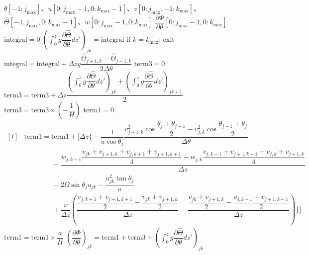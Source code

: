 \documentclass[ja=standard,xelatex]{bxjsarticle}
\newcommand{\pdif}[2]{\dfrac{\partial{#1}}{\partial#2}}
\newcommand{\dint}{\displaystyle\int}
\newcommand{\bracketnormal}[1]{\left(#1\right)}
\begin{document}
\begin{algorithm}[H]
  \caption*{\textbf{subroutine:} calculate\_partial\_Phi}
  \begin{algorithmic}[1]
    \Require $\theta[-1:j_\text{max}]$、$u[0:j_\text{max}-1,0:k_\text{max}-1]$、$v[0:j_\text{max},-1:k_\text{max}]$、$\hat{\Theta}[-1,j_\text{max},0:k_\text{max}-1]$、$w[0:j_\text{max}-1,0:k_\text{max}]$
    \Ensure $\pdif{\Phi}{\theta}[0:j_\text{max}-1,0:k_\text{max}]$
    \Statex
    \State {}
    \State $\text{integral} = 0$
    \State $\bracketnormal{\dint_0^z g\pdif{\hat{\Theta}}{\theta}dz'}_{jk} = \text{integral} $
    \State if $k=k_\text{max}$: exit
    \State $\text{integral}=\text{integral} + \Delta z g\dfrac{\hat{\Theta}_{j+1,k}-\hat{\Theta}_{j-1,k}}{2\Delta \theta}$
    \EndDo
    \State {}
    \State $\text{term3}=0$
    \State $\text{term3} = \text{term3} + \Delta z\dfrac{\bracketnormal{\dint_0^z g\pdif{\hat{\Theta}}{\theta}dz'}_{jk} + \bracketnormal{\dint_0^z g\pdif{\hat{\Theta}}{\theta}dz'}_{jk+1} }{2}$
    \EndDo
    \State $\text{term3} = \text{term3}\times\bracketnormal{-\dfrac{1}{H}}$
    \State {}
    \State $\text{term1}=0$
    \State $\begin{aligned}[t]
    &\text{term1} = \text{term1} + \Bigg[\Delta z\Bigg\{-\dfrac{1}{a\cos\theta_j}\dfrac{v_{j+1,k}^2 \cos\dfrac{\theta_j + \theta_{j+1}}{2}-v_{j,k}^2 \cos\dfrac{\theta_{j-1} + \theta_{j}}{2}}{\Delta \theta} \\[5pt]
    &\qquad\qquad - \dfrac{w_{j,k+1}\dfrac{v_{jk}+v_{j+1,k}+v_{j,k+1}+v_{j+1,k+1}}{4}-w_{j,k}\dfrac{v_{j,k-1}+v_{j+1,k-1}+v_{j,k}+v_{j+1,k}}{4}}{\Delta z}\\[5pt]
    &\qquad\qquad -2\Omega \sin\theta_{j}u_{jk}-\dfrac{u_{jk}^2\tan\theta_j}{a}\\[5pt]
    &\qquad\qquad+ \dfrac{\nu}{\Delta z}\bracketnormal{\dfrac{\dfrac{v_{j,k+1}+v_{j+1,k+1}}{2}-\dfrac{v_{jk}+v_{j+1,k}}{2}}{\Delta z}-\dfrac{\dfrac{v_{jk}+v_{j+1,k}}{2}-\dfrac{v_{j,k-1}+v_{j+1,k-1}}{2}}{\Delta z}}\Bigg\}\Bigg]
    \end{aligned}$
    \EndDo
    \State $\text{term1} = \text{term1}\times\dfrac{a}{H}$
    \State {}
    \State $\bracketnormal{\pdif{\Phi}{\theta}}_{jk} = \text{term1}+\text{term3} + \bracketnormal{\dint_0^z g\pdif{\hat{\Theta}}{\theta}dz'}_{jk}$
    \EndDo
    \EndDo
  \end{algorithmic}
\end{algorithm}
\end{document}
